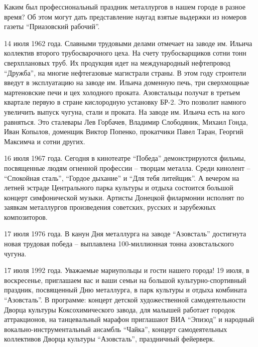 Каким был профессиональный праздник металлургов в нашем городе в разное время?
Об этом могут дать представление наугад взятые выдержки из номеров газеты
\enquote{Приазовский рабочий}. 

14 июля 1962 года. Славными трудовыми делами отмечает на заводе им. Ильича
коллектив второго трубосварочного цеха. На счету трубосварщиков сотни тонн
сверхплановых труб. Их продукция идет на международный нефтепровод \enquote{Дружба}, на
многие нефтегазовые магистрали страны. В этом году строители введут в
эксплуатацию на заводе им. Ильича доменную печь, три сверхмощные мартеновские
печи и цех холодного проката. Азовстальцы получат в третьем квартале первую в
стране кислородную установку БР-2. Это позволит намного увеличить выпуск
чугуна, стали и проката. На заводе им. Ильича есть на кого равняться. Это
сталевары Лев Горбачев, Владимир Слободяник, Михаил Гонда, Иван Копылов,
доменщик Виктор Попенко, прокатчики Павел Таран, Георгий Максимча и сотни
других.

16 июля 1967 года. Сегодня в кинотеатре \enquote{Победа} демонстрируются фильмы,
посвященные людям огненной профессии – творцам металла. Среди кинолент –
\enquote{Спокойная сталь}, \enquote{Гордое дыхание} и \enquote{Для тебя литейщик}. А вечером на летней
эстраде Центрального парка культуры и отдыха состоится  большой концерт
симфонической музыки. Артисты Донецкой филармонии исполнят по заявкам
металлургов произведения советских, русских и зарубежных композиторов.

17 июля 1976 года. В канун Дня металлурга на заводе \enquote{Азовсталь} достигнута
новая трудовая победа – выплавлена 100-миллионная тонна азовстальского чугуна.

17 июля 1992 года. Уважаемые мариупольцы и гости нашего города! 19 июля, в
воскресенье, приглашаем вас и ваши семьи на  большой культурно-спортивный
праздник, посвященный Дню металлурга, в парк культуры и отдыха комбината
\enquote{Азовсталь}. В программе: концерт детской художественной самодеятельности
Дворца культуры Коксохимического завода, для малышей работает городок
аттракционов, на танцевальный марафон приглашают ВИА \enquote{Эпизод} и народный
вокально-инструментальный ансамбль \enquote{Чайка}, концерт самодеятельных коллективов
Дворца культуры \enquote{Азовсталь}, праздничный фейерверк.

